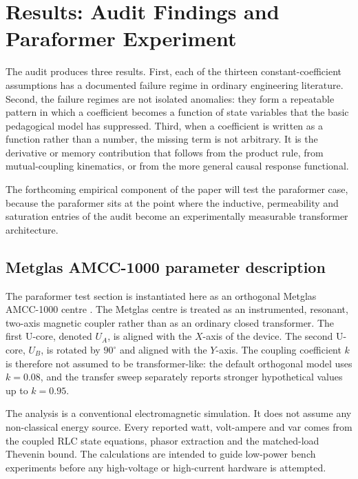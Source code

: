 \section{Results: Audit Findings and Paraformer Experiment}
The audit produces three results. First, each of the thirteen
constant-coefficient assumptions has a documented failure regime in ordinary
engineering literature. Second, the failure regimes are not isolated anomalies:
they form a repeatable pattern in which a coefficient becomes a function of
state variables that the basic pedagogical model has suppressed. Third, when a
coefficient is written as a function rather than a number, the missing term is
not arbitrary. It is the derivative or memory contribution that follows from
the product rule, from mutual-coupling kinematics, or from the more general
causal response functional.

The forthcoming empirical component of the paper will test the paraformer
case, because the paraformer sits at the point where the inductive,
permeability and saturation entries of the audit become an experimentally
measurable transformer architecture.



\subsection{Metglas AMCC-1000 parameter description}

The paraformer test section is instantiated here as an orthogonal Metglas
AMCC-1000 centre \cite{amcc1000}. The Metglas centre is treated as an instrumented, resonant,
two-axis magnetic coupler rather than as an ordinary closed transformer. The
first U-core, denoted \(U_A\), is aligned with the \(X\)-axis of the device.
The second U-core, \(U_B\), is rotated by \(90^\circ\) and aligned with the
\(Y\)-axis. The coupling coefficient \(k\) is therefore not assumed to be
transformer-like: the default orthogonal model uses \(k=0.08\), and the
transfer sweep separately reports stronger hypothetical values up to
\(k=0.95\).

The analysis is a conventional electromagnetic simulation. It does not assume
any non-classical energy source. Every reported watt, volt-ampere and var comes
from the coupled RLC state equations, phasor extraction and the matched-load
Thevenin bound. The calculations are intended to guide low-power bench
experiments before any high-voltage or high-current hardware is attempted.

